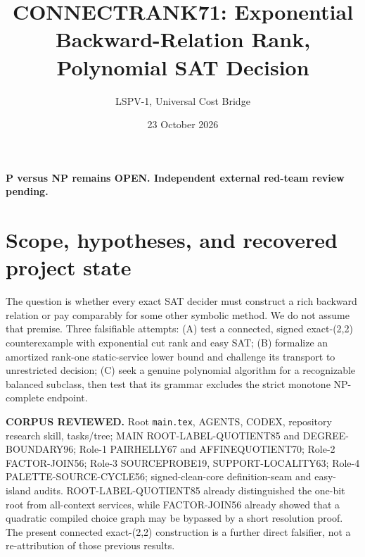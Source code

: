 \documentclass[11pt]{article}
\title{CONNECTRANK71: Exponential Backward-Relation Rank, Polynomial SAT Decision}
\author{LSPV-1, Universal Cost Bridge}
\date{23 October 2026}
\begin{document}
\maketitle
\begin{center}\textbf{P versus NP remains OPEN. Independent external red-team review pending.}\end{center}
\section{Scope, hypotheses, and recovered project state}
The question is whether every exact SAT decider must construct a rich backward relation or pay comparably for some other symbolic method. We do not assume that premise. Three falsifiable attempts: (A) test a connected, signed exact-(2,2) counterexample with exponential cut rank and easy SAT; (B) formalize an amortized rank-one static-service lower bound and challenge its transport to unrestricted decision; (C) seek a genuine polynomial algorithm for a recognizable balanced subclass, then test that its grammar excludes the strict monotone NP-complete endpoint.
\par\noindent\textbf{CORPUS REVIEWED.} Root \texttt{main.tex}, AGENTS, CODEX, repository research skill, tasks/tree; MAIN ROOT-LABEL-QUOTIENT85 and DEGREE-BOUNDARY96; Role-1 PAIRHELLY67 and AFFINEQUOTIENT70; Role-2 FACTOR-JOIN56; Role-3 SOURCEPROBE19, SUPPORT-LOCALITY63; Role-4 PALETTE-SOURCE-CYCLE56; signed-clean-core definition-seam and easy-island audits. ROOT-LABEL-QUOTIENT85 already distinguished the one-bit root from all-context services, while FACTOR-JOIN56 already showed that a quadratic compiled choice graph may be bypassed by a short resolution proof. The present connected exact-(2,2) construction is a further direct falsifier, not a re-attribution of those previous results.
\end{document}
